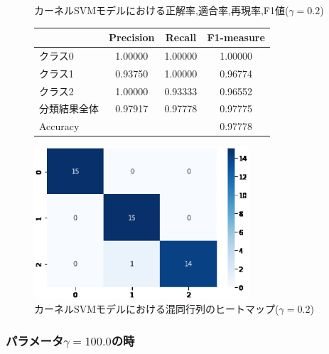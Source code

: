\documentclass{jarticle}     %
\makeatletter
\newcommand{\tblcaption}[1]{\def\@captype{table}\caption{#1}}
\makeatother
\begin{document}
\begin{figure}[H]
  \def\@captype{table}
  \begin{minipage}[c]{.48\textwidth}
    \tblcaption{カーネルSVMモデルにおける正解率,適合率,再現率,F1値($\gamma = 0.2$)}
    \label{table:カーネルSVM}
    \centering
      \begin{tabular}{lccc}
        \hline
        & Precision  &  Recall &  F1-measure \\
        \hline
        クラス0  & 1.00000  & 1.00000 & 1.00000 \\
        クラス1  & 0.93750  & 1.00000 & 0.96774 \\
        クラス2  & 1.00000  & 0.93333 & 0.96552 \\
        分類結果全体  &  0.97917  &  0.97778 & 0.97775 \\
        \hline
        Accuracy & & & 0.97778\\
        \hline
      \end{tabular}
  \end{minipage}
  \hfill
  \begin{minipage}[c]{.48\textwidth}
    \includegraphics[width=80mm]{assets/kernel_heatmap.eps}
    \caption{カーネルSVMモデルにおける混同行列のヒートマップ($\gamma = 0.2$)}
    \label{fig:カーネル0.2SVM}
  \end{minipage}
\end{figure}

\subsubsection{パラメータ$\gamma = 100.0$の時}
\end{document}

